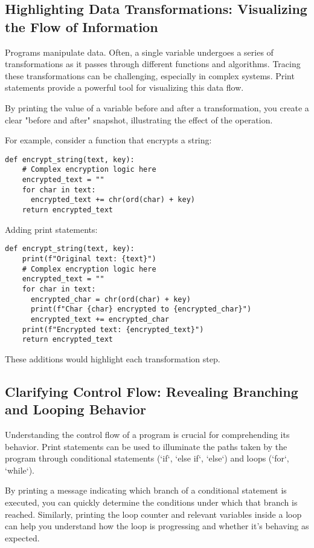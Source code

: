\documentclass{article}
\begin{document}
{{{{\subsection*{Highlighting Data Transformations: Visualizing the Flow of Information}

Programs manipulate data. Often, a single variable undergoes a series of transformations as it passes through different functions and algorithms. Tracing these transformations can be challenging, especially in complex systems. Print statements provide a powerful tool for visualizing this data flow.

By printing the value of a variable before and after a transformation, you create a clear "before and after" snapshot, illustrating the effect of the operation.

For example, consider a function that encrypts a string:

\begin{verbatim}
def encrypt_string(text, key):
    # Complex encryption logic here
    encrypted_text = ""
    for char in text:
      encrypted_text += chr(ord(char) + key)
    return encrypted_text
\end{verbatim}
Adding print statements:
\begin{verbatim}
def encrypt_string(text, key):
    print(f"Original text: {text}")
    # Complex encryption logic here
    encrypted_text = ""
    for char in text:
      encrypted_char = chr(ord(char) + key)
      print(f"Char {char} encrypted to {encrypted_char}")
      encrypted_text += encrypted_char
    print(f"Encrypted text: {encrypted_text}")
    return encrypted_text
\end{verbatim}
These additions would highlight each transformation step.

\subsection*{Clarifying Control Flow: Revealing Branching and Looping Behavior}

Understanding the control flow of a program is crucial for comprehending its behavior. Print statements can be used to illuminate the paths taken by the program through conditional statements (`if`, `else if`, `else`) and loops (`for`, `while`).

By printing a message indicating which branch of a conditional statement is executed, you can quickly determine the conditions under which that branch is reached. Similarly, printing the loop counter and relevant variables inside a loop can help you understand how the loop is progressing and whether it's behaving as expected.

}}}}
\end{document}
